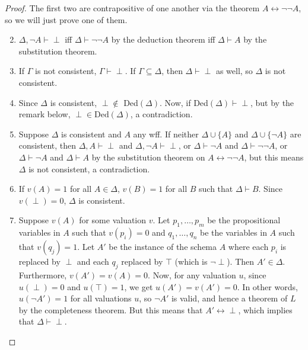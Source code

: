 \documentclass[12pt]{article}
\begin{document}
\begin{proof}  The first two are contrapositive of one another via the theorem $A \leftrightarrow \neg \neg A$, so we will just prove one of them.
\begin{enumerate}
\setcounter{enumi}{1}
\item $\Delta, \neg A \vdash \perp$ iff $\Delta \vdash \neg \neg A$ by the deduction theorem iff $\Delta \vdash A$ by the substitution theorem.
\item If $\Gamma$ is not consistent, $\Gamma\vdash \perp$. If $\Gamma\subseteq \Delta$, then $\Delta \vdash \perp$ as well, so $\Delta$ is not consistent.
\item Since $\Delta$ is consistent, $\perp \notin $ Ded$(\Delta)$.  Now, if Ded$(\Delta) \vdash \perp$, but by the remark below, $\perp \in \mbox{Ded}(\Delta)$, a contradiction.
\item Suppose $\Delta$ is consistent and $A$ any wff.  If neither $\Delta \cup \lbrace A \rbrace$ and $\Delta \cup \lbrace \neg A \rbrace$ are consistent, then $\Delta,A\vdash \perp$ and $\Delta,\neg A\vdash \perp$, or $\Delta \vdash \neg A$ and $\Delta \vdash \neg \neg A$, or $\Delta \vdash \neg A$ and $\Delta \vdash A$ by the substitution theorem on $A\leftrightarrow \neg \neg A$, but this means $\Delta$ is not consistent, a contradiction.
\item If $v(A)=1$ for all $A\in \Delta$, $v(B)=1$ for all $B$ such that $\Delta \vdash B$.  Since $v(\perp)=0$, $\Delta$ is consistent.
\item Suppose $v(A)$ for some valuation $v$.  Let $p_1,\ldots, p_m$ be the propositional variables in $A$ such that $v(p_i)=0$ and $q_1,\ldots, q_n$ be the variables in $A$ such that $v(q_j)=1$.  Let $A'$ be the instance of the schema $A$ where each $p_i$ is replaced by $\perp$ and each $q_j$ replaced by $\top$ (which is $\neg \perp$).  Then $A'\in \Delta$.  Furthermore, $v(A')=v(A)=0$.  Now, for any valuation $u$, since $u(\perp)=0$ and $u(\top)=1$, we get $u(A')=v(A')=0$.  In other words, $u(\neg A')=1$ for all valuations $u$, so $\neg A'$ is valid, and hence a theorem of $L$ by the completeness theorem.  But this means that $A'\leftrightarrow \perp$, which implies that $\Delta \vdash \perp$.
\end{enumerate}
\end{proof}
\end{document}
